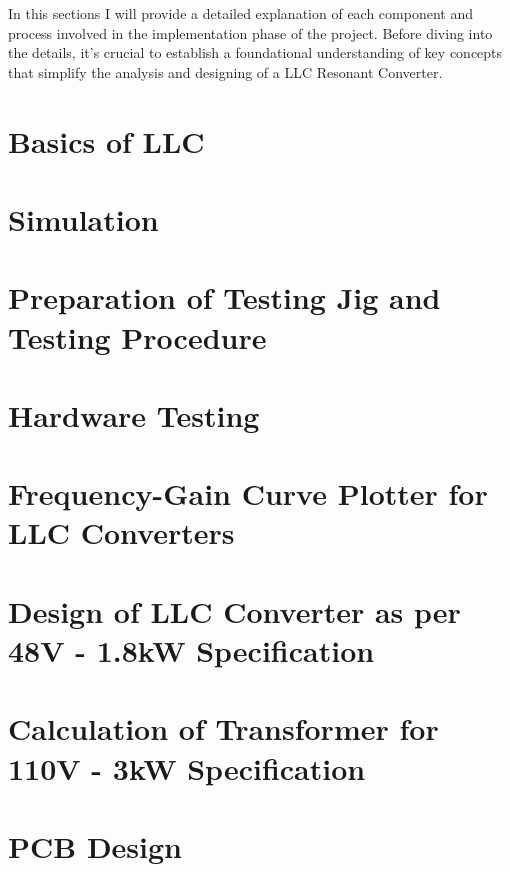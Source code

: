 In this sections I will provide a detailed explanation of each component and
process involved in the implementation phase of the project. Before diving into
the details, it's crucial to establish a foundational understanding of key
concepts that simplify the analysis and designing of a LLC Resonant Converter.

\section{Basics of LLC}

\section{Simulation}

\section{Preparation of Testing Jig and Testing Procedure}

\section{Hardware Testing}

\section{Frequency-Gain Curve Plotter for LLC Converters}

\section{Design of LLC Converter as per 48V - 1.8kW Specification}

\section{Calculation of Transformer for 110V - 3kW Specification}

\section{PCB Design}

